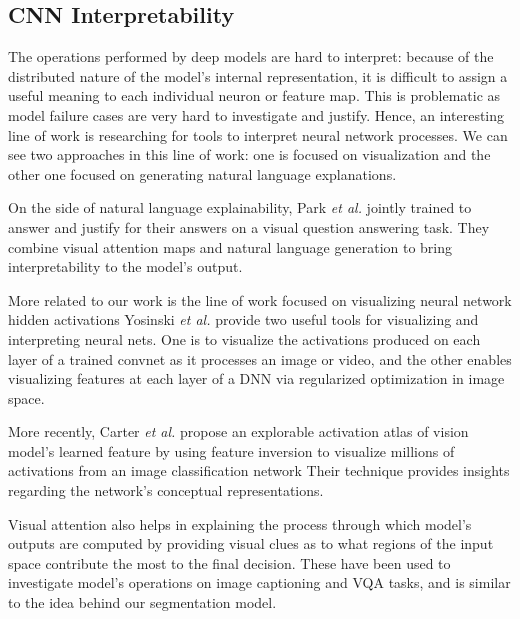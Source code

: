 \documentclass[10pt,twocolumn,letterpaper]{article}
\begin{document}
\subsection{CNN Interpretability}
The operations performed by deep models are hard to interpret:
because of the distributed nature of the model's internal representation,
it is difficult to assign a useful meaning to each individual neuron or feature map.
This is problematic as model failure cases are very hard to investigate and justify.
Hence, an interesting line of work is researching for tools to interpret neural network processes.
We can see two approaches in this line of work:
one is focused on visualization and the other one focused on generating natural language explanations.
 
On the side of natural language explainability, Park \textit{et al.} \cite{park2016attentive} jointly trained to answer and justify for their
answers on a visual question answering task. 
They combine visual attention maps and natural language generation to bring interpretability to the model's output.
 
More related to our work is the line of work focused on visualizing neural network hidden activations
Yosinski \textit{et al.} \cite{yosinski2015understanding} provide two useful tools for visualizing and interpreting neural nets. 
One is to visualize  the activations produced on each layer of a trained convnet as it 
processes an image or video, and the other enables visualizing 
features at each layer of a DNN via regularized optimization in image space.

More recently, Carter \textit{et al.} \cite{xxx} propose an explorable activation atlas of vision model's learned feature by using feature inversion to visualize millions of activations from an image classification network
Their technique provides insights regarding the network's conceptual representations.

Visual attention \cite{xxx} also helps in explaining the process through which model's 
outputs are computed by providing visual clues as to what regions of the input space 
contribute the most to the final decision. 
These have been used to investigate model's operations on image captioning \cite{xxx} and VQA \cite{xxx} tasks,
and is similar to the idea behind our segmentation model.
\end{document}
